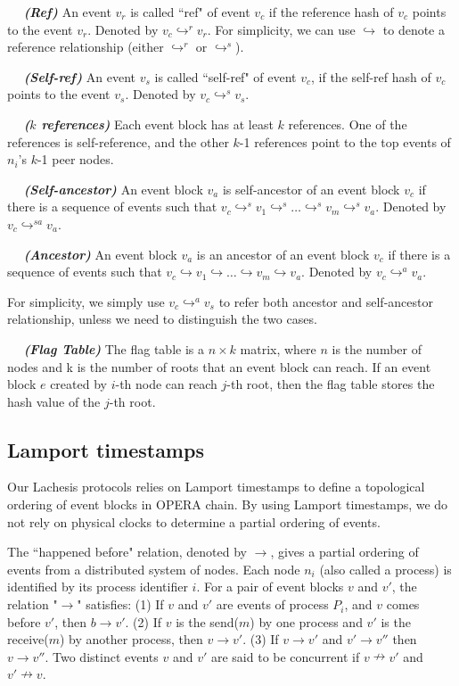 \documentclass{article}
\newcommand{\dfnn}[2]{$\quad$ \textbf{\emph{(#1)}} {#2}}
\newcommand{\eself}{\hookrightarrow^{s}}
\newcommand{\eref}{\hookrightarrow^{r}}
\newcommand{\eancestor}{\hookrightarrow^{a}}
\newcommand{\eselfancestor}{\hookrightarrow^{sa}}
\newcommand{\erefz}{\hookrightarrow}
\begin{document}
\dfnn{Ref}{An event $v_r$ is called ``ref" of event $v_c$ if the reference hash of $v_c$ points to the event $v_r$. Denoted by $v_c \eref v_r$. For simplicity, we can use $\erefz$ to denote a reference relationship (either $\eref$ or $\eself$).}

\dfnn{Self-ref}{An event $v_s$ is called ``self-ref" of event $v_c$, if the self-ref hash of $v_c$ points to the event $v_s$. Denoted by $v_c \eself v_s$.}

\dfnn{$k$ references}{Each event block has at least $k$ references. One of the references is self-reference, and the other $k$-1 references point to the top events of $n_i$'s $k$-1 peer nodes.}

\dfnn{Self-ancestor}{An event block $v_a$ is self-ancestor of an event block $v_c$ if there is a sequence of events such that $v_c \eself v_1 \eself \dots \eself v_m \eself v_a $. Denoted by $v_c \eselfancestor v_a$.}

\dfnn{Ancestor}{An event block $v_a$ is an ancestor of an event block $v_c$ if there is a sequence of events such that $v_c \erefz v_1 \erefz \dots \erefz v_m \erefz v_a $. Denoted by $v_c \eancestor v_a$.}

For simplicity, we simply use $v_c \eancestor v_s$ to refer both ancestor and self-ancestor relationship, unless we need to distinguish the two cases.

\dfnn{Flag Table}{The flag table is a $n \times k$ matrix, where $n$ is the number of nodes and k is the number of roots that an event block can reach. If an event block $e$ created by $i$-th node can reach $j$-th root, then the flag table stores the hash value of the $j$-th root.}

\subsection{Lamport timestamps}

Our Lachesis protocols relies on Lamport timestamps to define a topological ordering of event blocks in OPERA chain.  
By using Lamport timestamps, we do not rely on physical clocks to determine a partial ordering of events.

The ``happened before" relation, denoted by $\rightarrow$, gives a partial ordering of events from a distributed system of nodes. 
Each node $n_i$ (also called a process) is identified by its process identifier $i$. 
For a pair of event blocks $v$ and $v'$, the relation "$\rightarrow$" satisfies: (1) If $v$ and $v'$ are events of process $P_i$, and $v$ comes before $v'$, then $b \rightarrow v'$. (2) If $v$ is the send($m$) by one process and $v'$ is the receive($m$) by another process, then $v \rightarrow v'$. (3) If $v \rightarrow v'$ and $v' \rightarrow v''$ then $v \rightarrow v''$. 
Two distinct events $v$ and $v'$ are said to be concurrent if $v \nrightarrow v'$ and $v' \nrightarrow v$.
\end{document}
